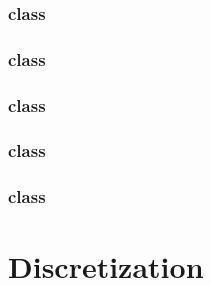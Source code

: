 \documentclass[10pt]{article}
\begin{document}
\subsubsection{ class}  \label{sss:class-hypre}

\begin{center}
\end{center}

\subsubsection{ class} \label{sss:class-mpi}

\begin{center}
\end{center}

\subsubsection{ class} \label{sss:class-point}

\begin{center}
\end{center}

\subsubsection{ class} \label{sss:class-field}

\begin{center}
\end{center}

\subsubsection{ class} \label{sss:class-array}

\section{Discretization} \label{s:discretization}
\end{document}
